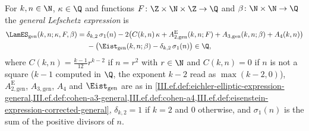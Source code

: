 For $k,n\in\N$, $\kappa\in\Q$ and functions $F\colon\Z\times\N\times\Z\to\Q$ and $\beta\colon\N\times\N\to\Q$ the \emph{general Lefschetz
expression} is
\[
\begin{aligned}
  \LamES_{\mathrm{gen}}(k,n;\kappa,F,\beta)={}&\delta_{k,2}\,\sigma_1(n)-2\bigl(C(k,n)\,\kappa+A_{2,\mathrm{gen}}^{\mathrm E}(k,n;F)+A_{3,\mathrm{gen}}(k,n;\beta)+A_4(k,n)\bigr)\\
  &-\bigl(\Eist_{\mathrm{gen}}(k,n;\beta)-\delta_{k,2}\,\sigma_1(n)\bigr)\in\Q,
\end{aligned}
\]
where $C(k,n)=\frac{k-1}{12}r^{k-2}$ if $n=r^2$ with $r\in\N$ and $C(k,n)=0$ if $n$ is not a square ($k-1$ computed in $\Q$, the exponent $k-2$
read as $\max(k-2,0)$), $A_{2,\mathrm{gen}}^{\mathrm E}$, $A_{3,\mathrm{gen}}$, $A_4$ and $\Eist_{\mathrm{gen}}$ are as in
\cref{III.ef.def:eichler-elliptic-expression-general,III.ef.def:cohen-a3-general,III.ef.def:cohen-a4,III.ef.def:eisenstein-expression-corrected-general},
$\delta_{k,2}=1$ if $k=2$ and $0$ otherwise, and $\sigma_1(n)$ is the sum of the positive divisors of $n$.
